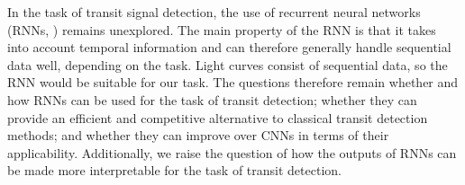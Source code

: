 In the task of transit signal detection, the use of recurrent neural networks (RNNs, \cite{hochreiter1997long,cho2014learning}) remains unexplored. The main property of the RNN is that it takes into account temporal information and can therefore generally handle sequential data well, depending on the task. Light curves consist of sequential data, so the RNN would be suitable for our task. The questions therefore remain whether and how RNNs can be used for the task of transit detection; whether they can provide an efficient and competitive alternative to classical transit detection methods; and whether they can improve over CNNs in terms of their applicability. Additionally, we raise the question of how the outputs of RNNs can be made more interpretable for the task of transit detection. 

